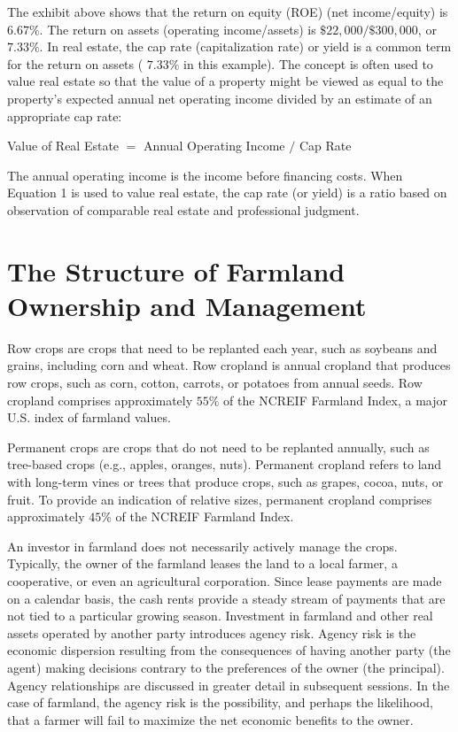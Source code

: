 \documentclass[11pt]{article}
\begin{document}
The exhibit above shows that the return on equity (ROE) (net income/equity) is $6.67 \%$. The return on assets (operating income/assets) is $\$ 22,000 / \$ 300,000$, or $7.33 \%$. In real estate, the cap rate (capitalization rate) or yield is a common term for the return on assets ( $7.33 \%$ in this example). The concept is often used to value real estate so that the value of a property might be viewed as equal to the property's expected annual net operating income divided by an estimate of an appropriate cap rate:

Value of Real Estate $=$ Annual Operating Income $/$ Cap Rate

The annual operating income is the income before financing costs. When Equation 1 is used to value real estate, the cap rate (or yield) is a ratio based on observation of comparable real estate and professional judgment.

\section*{The Structure of Farmland Ownership and Management}
Row crops are crops that need to be replanted each year, such as soybeans and grains, including corn and wheat. Row cropland is annual cropland that produces row crops, such as corn, cotton, carrots, or potatoes from annual seeds. Row cropland comprises approximately $55 \%$ of the NCREIF Farmland Index, a major U.S. index of farmland values.

Permanent crops are crops that do not need to be replanted annually, such as tree-based crops (e.g., apples, oranges, nuts). Permanent cropland refers to land with long-term vines or trees that produce crops, such as grapes, cocoa, nuts, or fruit. To provide an indication of relative sizes, permanent cropland comprises approximately $45 \%$ of the NCREIF Farmland Index.

An investor in farmland does not necessarily actively manage the crops. Typically, the owner of the farmland leases the land to a local farmer, a cooperative, or even an agricultural corporation. Since lease payments are made on a calendar basis, the cash rents provide a steady stream of payments that are not tied to a particular growing season. Investment in farmland and other real assets operated by another party introduces agency risk. Agency risk is the economic dispersion resulting from the consequences of having another party (the agent) making decisions contrary to the preferences of the owner (the principal). Agency relationships are discussed in greater detail in subsequent sessions. In the case of farmland, the agency risk is the possibility, and perhaps the likelihood, that a farmer will fail to maximize the net economic benefits to the owner.
\end{document}
